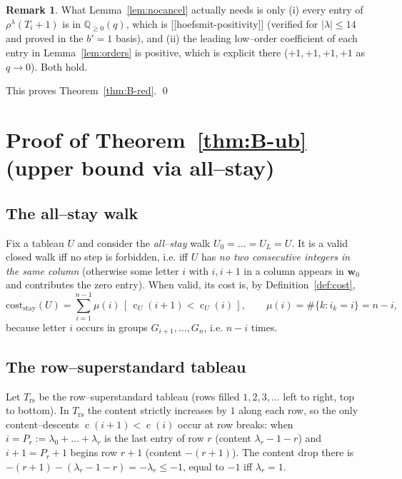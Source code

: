 \documentclass[11pt]{article}
\theoremstyle{definition}
\newtheorem{remark}[theorem]{Remark}
\DeclareMathOperator{\content}{c}
\begin{document}
\begin{remark}\label{rem:pos}
What Lemma~\ref{lem:nocancel} actually needs is only (i) every entry of
$\rho^\lambda(T_i+1)$ is in $\mathbb Q_{\ge0}(q)$, which is
[[hoefsmit-positivity]] (verified for $|\lambda|\le14$ and proved in the
$b'=1$ basis), and (ii) the leading low--order coefficient of each entry
in Lemma~\ref{lem:orders} is positive, which is explicit there
($+1,+1,+1,+1$ as $q\to0$). Both hold.
\end{remark}

This proves Theorem~\ref{thm:B-red}. \qed

\section{Proof of Theorem~\ref{thm:B-ub} (upper bound via all--stay)}
\label{sec:ub}

\subsection{The all--stay walk}
Fix a tableau $U$ and consider the \emph{all--stay} walk
$U_0=\dots=U_L=U$. It is a valid closed walk iff no step is forbidden, i.e.
iff $U$ has \emph{no two consecutive integers in the same column}
(otherwise some letter $i$ with $i,i{+}1$ in a column appears in
$\mathbf w_0$ and contributes the zero entry). When valid, its cost is, by
Definition~\ref{def:cost},
\begin{equation}\label{eq:allstay}
\mathrm{cost}_{\text{stay}}(U)=\sum_{i=1}^{n-1}\mu(i)\,
[\,\content_U(i{+}1)<\content_U(i)\,],\qquad \mu(i)=\#\{k:i_k=i\}=n-i,
\end{equation}
because letter $i$ occurs in groups $G_{i+1},\dots,G_n$, i.e. $n-i$ times.

\subsection{The row--superstandard tableau}
Let $T_{\mathrm{rs}}$ be the row--superstandard tableau (rows filled
$1,2,3,\dots$ left to right, top to bottom). In $T_{\mathrm{rs}}$ the content
strictly increases by $1$ along each row, so the only content--descents
$\content(i{+}1)<\content(i)$ occur at row breaks: when $i=P_r:=\lambda_0+\dots
+\lambda_r$ is the last entry of row $r$ (content $\lambda_r-1-r$) and
$i{+}1=P_r+1$ begins row $r+1$ (content $-(r+1)$). The content drop there is
$-(r+1)-(\lambda_r-1-r)=-\lambda_r\le-1$, equal to $-1$ iff $\lambda_r=1$.
\end{document}
